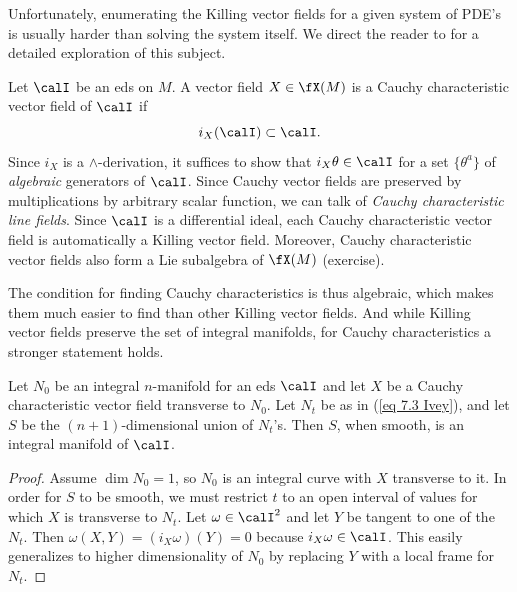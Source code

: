 Unfortunately, enumerating the Killing vector fields for a given system of PDE's is usually harder than solving the system itself. We direct the reader to \cite{Olver} for a detailed exploration of this subject.

\begin{defn}
    Let $\calI$ be an \gls{eds} on $M$. A vector field $X\in\fX(M)$ is a Cauchy characteristic vector field of $\calI$ if 
    \[i_X (\calI)\subset \calI.\]
    Since $i_X$ is a $\wedge$-derivation, it suffices to show that $i_X\theta\in\calI$ for a set $\{\theta^a\}$ of \emph{algebraic} generators of $\calI$. Since Cauchy vector fields are preserved by multiplications by arbitrary scalar function, we can talk of \emph{Cauchy characteristic line fields}. Since $\calI$ is a differential ideal, each Cauchy characteristic vector field is automatically a Killing vector field. Moreover, Cauchy characteristic vector fields also form a Lie subalgebra of $\fX(M)$ (exercise).
\end{defn}

The condition for finding Cauchy characteristics is thus algebraic, which makes them much easier to find than other Killing vector fields. And while Killing vector fields preserve the set of integral manifolds, for Cauchy characteristics a stronger statement holds.

\begin{prop}\label{prop 7.1.8 Ivey}
    Let $N_0$ be an integral $n$-manifold for an \gls{eds} $\calI$ and let $X$ be a Cauchy characteristic vector field transverse to $N_0$. Let $N_t$ be as in (\ref{eq 7.3 Ivey}), and let $S$ be the $(n+1)$-dimensional union of $N_t$'s. Then $S$, when smooth, is an integral manifold of $\calI$.
\end{prop}
\begin{proof}
    Assume $\dim N_0=1$, so $N_0$ is an integral curve with $X$ transverse to it. In order for $S$ to be smooth, we must restrict $t$ to an open interval of values for which $X$ is transverse to $N_t$. Let $\omega\in\calI^2$ and let $Y$ be tangent to one of the $N_t$. Then $\omega(X,Y)=(i_X\omega)(Y)=0$ because $i_X\omega\in\calI$.  This easily generalizes to higher dimensionality of $N_0$ by replacing $Y$ with a local frame for $N_t$.
\end{proof}

